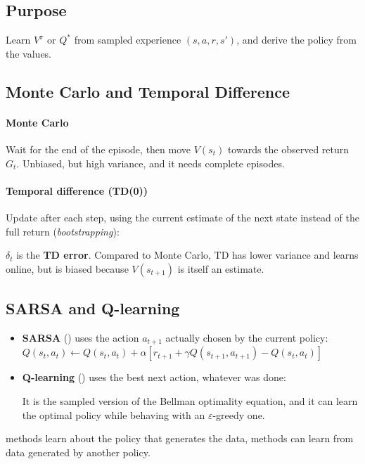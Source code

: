 \subsection{Purpose}
Learn $V^{\pi}$ or $Q^{*}$ from sampled experience $(s,a,r,s')$, and derive the policy from
the values.

\subsection{Monte Carlo and Temporal Difference}
\paragraph{Monte Carlo} Wait for the end of the episode, then move $V(s_{t})$ towards the
observed return $G_{t}$. Unbiased, but high variance, and it needs complete episodes.

\paragraph{Temporal difference (TD(0))} Update after each step, using the current estimate
of the next state instead of the full return (\emph{bootstrapping}):
\begin{center}
\end{center}
$\delta_{t}$ is the \textbf{TD error}. Compared to Monte Carlo, TD has lower variance and
learns online, but is biased because $V(s_{t+1})$ is itself an estimate.

\subsection{SARSA and Q-learning}
\begin{itemize}
    \item \textbf{SARSA} () uses the action $a_{t+1}$ actually chosen by the
        current policy:\\
        $Q(s_{t},a_{t})\leftarrow Q(s_{t},a_{t})+\alpha\left[r_{t+1}+\gamma Q(s_{t+1},
        a_{t+1})-Q(s_{t},a_{t})\right]$
    \item \textbf{Q-learning} () uses the best next action, whatever was
        done:
        \begin{center}
        \end{center}
        It is the sampled version of the Bellman optimality equation, and it can learn
        the optimal policy while behaving with an $\varepsilon$-greedy one.
\end{itemize}
 methods learn about the policy that generates the data, 
methods can learn from data generated by another policy.

